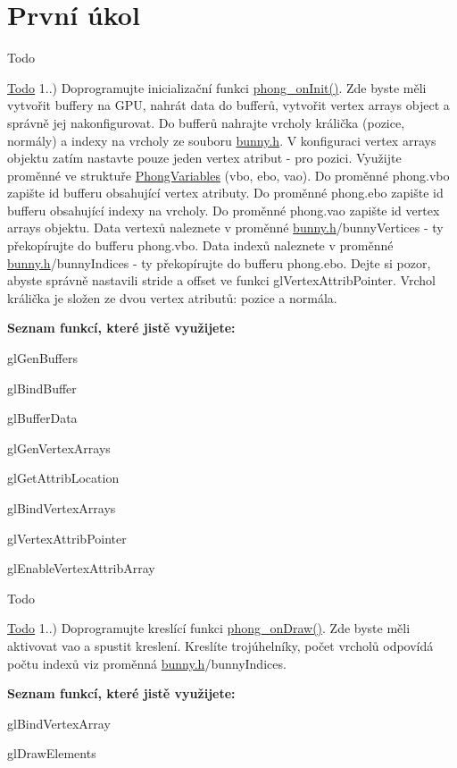 \hypertarget{group__task1}{\section{První úkol}
\label{group__task1}
}
\begin{DoxyRefDesc}{Todo}
\item[\hyperlink{todo__todo000004}{Todo}]1..) Doprogramujte inicializační funkci \hyperlink{student_8h_ac2adb2ba4e748239b9db4d037584d3cc}{phong\-\_\-on\-Init()}. Zde byste měli vytvořit buffery na G\-P\-U, nahrát data do bufferů, vytvořit vertex arrays object a správně jej nakonfigurovat. Do bufferů nahrajte vrcholy králička (pozice, normály) a indexy na vrcholy ze souboru \hyperlink{bunny_8h}{bunny.\-h}. V konfiguraci vertex arrays objektu zatím nastavte pouze jeden vertex atribut -\/ pro pozici. Využijte proměnné ve struktuře \hyperlink{structPhongVariables}{Phong\-Variables} (vbo, ebo, vao). Do proměnné phong.\-vbo zapište id bufferu obsahující vertex atributy. Do proměnné phong.\-ebo zapište id bufferu obsahující indexy na vrcholy. Do proměnné phong.\-vao zapište id vertex arrays objektu. Data vertexů naleznete v proměnné \hyperlink{bunny_8h}{bunny.\-h}/bunny\-Vertices -\/ ty překopírujte do bufferu phong.\-vbo. Data indexů naleznete v proměnné \hyperlink{bunny_8h}{bunny.\-h}/bunny\-Indices -\/ ty překopírujte do bufferu phong.\-ebo. Dejte si pozor, abyste správně nastavili stride a offset ve funkci gl\-Vertex\-Attrib\-Pointer. Vrchol králička je složen ze dvou vertex atributů\-: pozice a normála.\par
 {\bfseries Seznam funkcí, které jistě využijete\-:}
\begin{DoxyItemize}
\item gl\-Gen\-Buffers
\item gl\-Bind\-Buffer
\item gl\-Buffer\-Data
\item gl\-Gen\-Vertex\-Arrays
\item gl\-Get\-Attrib\-Location
\item gl\-Bind\-Vertex\-Arrays
\item gl\-Vertex\-Attrib\-Pointer
\item gl\-Enable\-Vertex\-Attrib\-Array 
\end{DoxyItemize}\end{DoxyRefDesc}


\begin{DoxyRefDesc}{Todo}
\item[\hyperlink{todo__todo000008}{Todo}]1..) Doprogramujte kreslící funkci \hyperlink{student_8h_a53ffbb1a271d285abdaf7a029192f47e}{phong\-\_\-on\-Draw()}. Zde byste měli aktivovat vao a spustit kreslení. Kreslíte trojúhelníky, počet vrcholů odpovídá počtu indexů viz proměnná \hyperlink{bunny_8h}{bunny.\-h}/bunny\-Indices.\par
 {\bfseries Seznam funkcí, které jistě využijete\-:}
\begin{DoxyItemize}
\item gl\-Bind\-Vertex\-Array
\item gl\-Draw\-Elements 
\end{DoxyItemize}\end{DoxyRefDesc}
